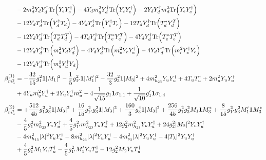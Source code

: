 {\begin{align}
 &-2 {m_d^2  Y_d  Y_{d}^{\dagger}} \mbox{Tr}\Big({Y_e  Y_{e}^{\dagger}}\Big) -4 {Y_d  m_q^2  Y_{d}^{\dagger}} \mbox{Tr}\Big({Y_e  Y_{e}^{\dagger}}\Big) -2 {Y_d  Y_{d}^{\dagger}  m_d^2} \mbox{Tr}\Big({Y_e  Y_{e}^{\dagger}}\Big) \nonumber \\ 
 &-12 {Y_d  T_{d}^{\dagger}} \mbox{Tr}\Big({Y_{d}^{\dagger}  T_d}\Big) -4 {Y_d  T_{d}^{\dagger}} \mbox{Tr}\Big({Y_{e}^{\dagger}  T_e}\Big) -12 {T_d  Y_{d}^{\dagger}} \mbox{Tr}\Big({T_d^*  Y_{d}^{T}}\Big) \nonumber \\ 
 &-12 {Y_d  Y_{d}^{\dagger}} \mbox{Tr}\Big({T_d^*  T_{d}^{T}}\Big) -4 {T_d  Y_{d}^{\dagger}} \mbox{Tr}\Big({T_e^*  Y_{e}^{T}}\Big) -4 {Y_d  Y_{d}^{\dagger}} \mbox{Tr}\Big({T_e^*  T_{e}^{T}}\Big) \nonumber \\ 
 &-12 {Y_d  Y_{d}^{\dagger}} \mbox{Tr}\Big({m_d^2  Y_d  Y_{d}^{\dagger}}\Big) -4 {Y_d  Y_{d}^{\dagger}} \mbox{Tr}\Big({m_e^2  Y_e  Y_{e}^{\dagger}}\Big) -4 {Y_d  Y_{d}^{\dagger}} \mbox{Tr}\Big({m_l^2  Y_{e}^{\dagger}  Y_e}\Big) \nonumber \\ 
 &-12 {Y_d  Y_{d}^{\dagger}} \mbox{Tr}\Big({m_q^2  Y_{d}^{\dagger}  Y_d}\Big) \\ 
\beta_{m_u^2}^{(1)} & =  
-\frac{32}{15} g_{1}^{2} {\bf 1} |M_1|^2 -\frac{1}{5} g_{1'}^{2} {\bf 1} |M_1'|^2 -\frac{32}{3} g_{3}^{2} {\bf 1} |M_3|^2 +4 m_{h_{23}}^2 {Y_u  Y_{u}^{\dagger}} +4 {T_u  T_{u}^{\dagger}} +2 {m_u^2  Y_u  Y_{u}^{\dagger}} \nonumber \\ 
 &+4 {Y_u  m_q^2  Y_{u}^{\dagger}} +2 {Y_u  Y_{u}^{\dagger}  m_u^2} -4 \frac{1}{\sqrt{15}} g_1 {\bf 1} \sigma_{1,1} +\frac{1}{\sqrt{10}} g_1' {\bf 1} \sigma_{1,4} \\ 
\beta_{m_u^2}^{(2)} & =  
+\frac{512}{45} g_{1}^{2} g_{3}^{2} {\bf 1} |M_3|^2 +\frac{16}{15} g_{1'}^{2} g_{3}^{2} {\bf 1} |M_3|^2 +\frac{160}{3} g_{3}^{4} {\bf 1} |M_3|^2 +\frac{256}{45} g_{1}^{2} g_{3}^{2} M_1 {\bf 1} M_3^* +\frac{8}{15} g_{1'}^{2} g_{3}^{2} M_1' {\bf 1} M_3^* \nonumber \\ 
 &-\frac{4}{5} g_{1}^{2} m_{h_{23}}^2 {Y_u  Y_{u}^{\dagger}} +\frac{4}{5} g_{1'}^{2} m_{h_{23}}^2 {Y_u  Y_{u}^{\dagger}} +12 g_{2}^{2} m_{h_{23}}^2 {Y_u  Y_{u}^{\dagger}} +24 g_{2}^{2} |M_2|^2 {Y_u  Y_{u}^{\dagger}} \nonumber \\ 
 &-4 m_{h_{13}}^2 |\lambda|^2 {Y_u  Y_{u}^{\dagger}} -8 m_{h_{23}}^2 |\lambda|^2 {Y_u  Y_{u}^{\dagger}} -4 m_{s_3}^2 |\lambda|^2 {Y_u  Y_{u}^{\dagger}} -4 |T_{\lambda}|^2 {Y_u  Y_{u}^{\dagger}} \nonumber \\ 
 &+\frac{4}{5} g_{1}^{2} M_1 {Y_u  T_{u}^{\dagger}} -\frac{4}{5} g_{1'}^{2} M_1' {Y_u  T_{u}^{\dagger}} -12 g_{2}^{2} M_2 {Y_u  T_{u}^{\dagger}} \nonumber \\ 

\end{align}}
